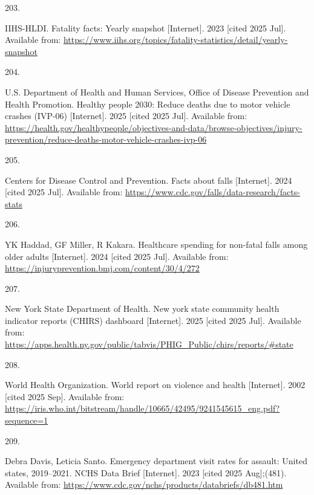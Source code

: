 \documentclass[
  english,
  letterpaper,
]{report}
\newlength{\cslhangindent}
\newlength{\csllabelwidth}
\newenvironment{CSLReferences}[2] %
 {\begin{list}{}{%
  \setlength{\itemindent}{0pt}
  \setlength{\leftmargin}{0pt}
  \setlength{\parsep}{0pt}
  \ifodd #1
   \setlength{\leftmargin}{\cslhangindent}
   \setlength{\itemindent}{-1\cslhangindent}
  \fi
  \setlength{\itemsep}{#2\baselineskip}}}
 {\end{list}}
\newcommand{\CSLLeftMargin}[1]{\parbox[t]{\csllabelwidth}{\strut#1\strut}}
\newcommand{\CSLRightInline}[1]{\parbox[t]{\linewidth - \csllabelwidth}{\strut#1\strut}}
\begin{document}
\begin{CSLReferences}{0}{1}
\CSLLeftMargin{203. }%
\CSLRightInline{IIHS-HLDI. Fatality facts: Yearly snapshot
{[}Internet{]}. 2023 {[}cited 2025 Jul{]}. Available from:
\url{https://www.iihs.org/topics/fatality-statistics/detail/yearly-snapshot}}

\CSLLeftMargin{204. }%
\CSLRightInline{U.S. Department of Health and Human Services, Office of
Disease Prevention and Health Promotion. Healthy people 2030: Reduce
deaths due to motor vehicle crashes (IVP-06) {[}Internet{]}. 2025
{[}cited 2025 Jul{]}. Available from:
\url{https://health.gov/healthypeople/objectives-and-data/browse-objectives/injury-prevention/reduce-deaths-motor-vehicle-crashes-ivp-06}}

\CSLLeftMargin{205. }%
\CSLRightInline{Centers for Disease Control and Prevention. Facts about
falls {[}Internet{]}. 2024 {[}cited 2025 Jul{]}. Available from:
\url{https://www.cdc.gov/falls/data-research/facts-stats}}

\CSLLeftMargin{206. }%
\CSLRightInline{YK Haddad, GF Miller, R Kakara. Healthcare spending for
non-fatal falls among older adults {[}Internet{]}. 2024 {[}cited 2025
Jul{]}. Available from:
\url{https://injuryprevention.bmj.com/content/30/4/272}}

\CSLLeftMargin{207. }%
\CSLRightInline{New York State Department of Health. New york state
community health indicator reports (CHIRS) dashboard {[}Internet{]}.
2025 {[}cited 2025 Jul{]}. Available from:
\url{https://apps.health.ny.gov/public/tabvis/PHIG_Public/chirs/reports/\#state}}

\CSLLeftMargin{208. }%
\CSLRightInline{World Health Organization. World report on violence and
health {[}Internet{]}. 2002 {[}cited 2025 Sep{]}. Available from:
\url{https://iris.who.int/bitstream/handle/10665/42495/9241545615_eng.pdf?sequence=1}}

\CSLLeftMargin{209. }%
\CSLRightInline{Debra Davis, Leticia Santo. Emergency department visit
rates for assault: United states, 2019--2021. NCHS Data Brief
{[}Internet{]}. 2023 {[}cited 2025 Aug{]};(481). Available from:
\url{https://www.cdc.gov/nchs/products/databriefs/db481.htm}}


\end{CSLReferences}
\end{document}
